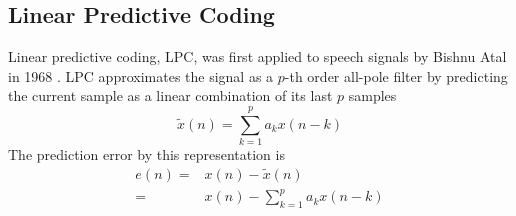 \subsection{Linear Predictive Coding} %
\label{sub:linear_predictive_coding}
Linear predictive coding, LPC, was first applied to speech signals by Bishnu Atal \etal in 1968 \cite{atal68}. LPC approximates the signal as a $p$-th order all-pole filter by predicting the current sample as a linear combination of its last $p$ samples \cite{digsig}
\begin{equation}
	\tilde{x}(n) = \sum_{k=1}^{p}a_k x(n-k)
\end{equation}
The prediction error by this representation is 
\begin{equation}
	\begin{split}
		e(n)= & x(n)-\tilde{x}(n) \\
		= & x(n)-\sum_{k=1}^{p}a_k x(n-k)
	\end{split}
\end{equation}

